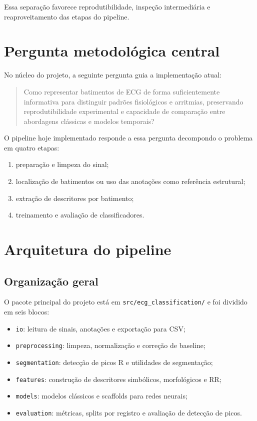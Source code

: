 \documentclass[12pt,a4paper]{article}
\begin{document}
Essa separa\c{c}\~ao favorece reprodutibilidade, inspe\c{c}\~ao intermedi\'aria e reaproveitamento das etapas do pipeline.

\section{Pergunta metodol\'ogica central}
No n\'ucleo do projeto, a seguinte pergunta guia a implementa\c{c}\~ao atual:

\begin{quote}
Como representar batimentos de ECG de forma suficientemente informativa para distinguir padr\~oes fisiol\'ogicos e arritmias, preservando reprodutibilidade experimental e capacidade de compara\c{c}\~ao entre abordagens cl\'assicas e modelos temporais?
\end{quote}

O pipeline hoje implementado responde a essa pergunta decompondo o problema em quatro etapas:

\begin{enumerate}[label=\arabic*.]
    \item prepara\c{c}\~ao e limpeza do sinal;
    \item localiza\c{c}\~ao de batimentos ou uso das anota\c{c}\~oes como refer\^encia estrutural;
    \item extra\c{c}\~ao de descritores por batimento;
    \item treinamento e avalia\c{c}\~ao de classificadores.
\end{enumerate}

\section{Arquitetura do pipeline}
\subsection{Organiza\c{c}\~ao geral}
O pacote principal do projeto est\'a em \texttt{src/ecg\_classification/} e foi dividido em seis blocos:

\begin{itemize}
    \item \texttt{io}: leitura de sinais, anota\c{c}\~oes e exporta\c{c}\~ao para CSV;
    \item \texttt{preprocessing}: limpeza, normaliza\c{c}\~ao e corre\c{c}\~ao de baseline;
    \item \texttt{segmentation}: detec\c{c}\~ao de picos R e utilidades de segmenta\c{c}\~ao;
    \item \texttt{features}: constru\c{c}\~ao de descritores simb\'olicos, morfol\'ogicos e RR;
    \item \texttt{models}: modelos cl\'assicos e scaffolds para redes neurais;
    \item \texttt{evaluation}: m\'etricas, splits por registro e avalia\c{c}\~ao de detec\c{c}\~ao de picos.
\end{itemize}
\end{document}
